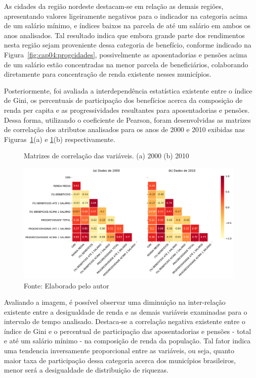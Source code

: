 As cidades da região nordeste destacam-se em relação as demais regiões, apresentando valores ligeiramente negativos para o indicador na categoria acima de um salário mínimo, e índices baixos na parcela de até um salário em ambos os anos analisados. Tal resultado indica que embora grande parte dos rendimentos nesta região sejam proveniente dessa categoria de benefício, conforme indicado na Figura~\ref{fig:cap04:progcidades}, possivelmente as aposentadorias e pensões acima de um salário estão concentradas na menor parcela de beneficiários, colaborando diretamente para concentração de renda existente nesses municípios. 

Posteriormente, foi avaliada a interdependência estatística existente entre o índice de Gini, os percentuais de participação dos benefícios acerca da composição de renda per capita e as progressividades resultantes para aposentadorias e pensões. Dessa forma, utilizando o coeficiente de Pearson, foram desenvolvidas as matrizes de correlação dos atributos analisados para os anos de 2000 e 2010 exibidas nas Figuras~\ref{fig:cap04:matrixcorr}(a) e \ref{fig:cap04:matrixcorr}(b) respectivamente.

\begin{figure}[!h]
    \centering
    \caption{Matrizes de correlação das variáveis. (a) 2000 (b) 2010}
    \includegraphics[width=\textwidth]{figs/cap04_corr_matrix.pdf}
    \caption*{\footnotesize{Fonte: Elaborado pelo autor}}
    \label{fig:cap04:matrixcorr}
\end{figure}

Avaliando a imagem, é possível observar uma diminuição na inter-relação existente entre a desigualdade de renda e as demais variáveis examinadas para o intervalo de tempo analisado. Destaca-se a correlação negativa existente entre o índice de Gini e o percentual de participação das aposentadorias e pensões - total e até um salário mínimo - na composição de renda da população. Tal fator indica uma tendencia inversamente proporcional entre as variáveis, ou seja, quanto maior taxa de participação dessa categoria acerca dos municípios brasileiros, menor será a desigualdade de distribuição de riquezas. 

